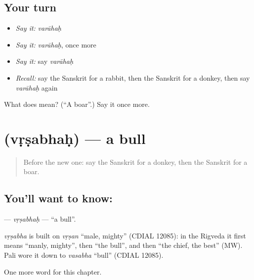 \subsection*{Your turn}
\begin{itemize}
\raggedright
  \item \emph{Say it:} \emph{varāhaḥ}
  \item \emph{Say it:} \emph{varāhaḥ}, once more
  \item \emph{Say it:} say \emph{varāhaḥ}
  \item \emph{Recall:} say the Sanskrit for a rabbit, then the Sanskrit for a donkey, then say \emph{varāhaḥ} again
\end{itemize}

\begin{tcolorbox}[breakable,colback=teal!4,colframe=teal!35!black,title={Before you move on}]
What does  mean? (\textquotedblleft{}A boar\textquotedblright{}.) Say it once more.
\end{tcolorbox}
\section[\texorpdfstring{\sk{वृषभः} (vṛṣabhaḥ)}{वृषभः (vṛṣabhaḥ)}]{ (vṛṣabhaḥ) — a bull}

\label{lesson:SA-C113-vrsabhah}



\begin{quote}
Before the new one: say the Sanskrit for a donkey, then the Sanskrit for a boar.
\end{quote}

\subsection*{You'll want to know: }
\textbf{} — \emph{vṛṣabhaḥ} — \textquotedblleft{}a bull\textquotedblright{}.

\begin{cousinweb}
\emph{vṛṣabha} is built on \emph{vṛṣan} \textquotedblleft{}male, mighty\textquotedblright{} (CDIAL 12085): in the Rigveda it first means \textquotedblleft{}manly, mighty\textquotedblright{}, then \textquotedblleft{}the bull\textquotedblright{}, and then \textquotedblleft{}the chief, the best\textquotedblright{} (MW). Pali wore it down to \emph{vasabha} \textquotedblleft{}bull\textquotedblright{} (CDIAL 12085).
\end{cousinweb}

\begin{grammarlens}[title={What you've built}]
One more word for this chapter.
\end{grammarlens}

